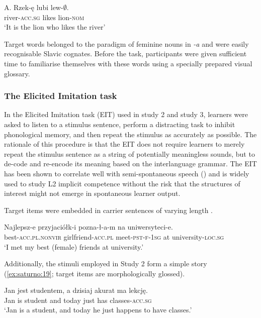 \documentclass[output=paper,            colorlinks, citecolor=brown            		  ]{langscibook}
\begin{document}
 \gll A.  Rzek-ę    lubi  lew-${\emptyset}$.\\
{} river-\textsc{acc.sg}  likes  lion-\textsc{nom}\\
\glt \hspace{2.5ex}‘It is the lion who likes the river’
\z

Target words belonged to the paradigm of feminine nouns in \textit{{}-a} and were easily recognisable Slavic cognates. Before the task, participants were given sufficient time to familiarise themselves with these words using a specially prepared visual glossary.

\subsubsection{The Elicited Imitation task}\label{sec:saturno:3.1.2}

In the Elicited Imitation task (EIT) used in study 2 and study 3, learners were asked to listen to a stimulus sentence, perform a distracting task to inhibit phonological memory, and then repeat the stimulus as accurately as possible. The rationale of this procedure is that the EIT does not require learners to merely repeat the stimulus sentence as a string of potentially meaningless sounds, but to de-code and re-encode its meaning based on the interlanguage grammar. The EIT has been shown to correlate well with semi-spontaneous speech (\citealt{IsbellSon2022, KostromitinaPlonsky2022, WuEtAl2022}) and is widely used to study L2 implicit competence without the risk that the structures of interest might not emerge in spontaneous learner output. 

Target items were embedded in carrier sentences of varying length .

\ea\label{ex:saturno:18}  
\gll Najlepsz-e     przyjaciółk-i     pozna-ł-a-m     na   uniwersyteci-e.\\
  best-\textsc{acc.pl.nonvir}  girlfriend-\textsc{acc.pl}  meet-\textsc{pst-f-1sg}  at  university-\textsc{loc.sg}\\
\glt  ‘I met my best (female) friends at university.’
\z

Additionally, the stimuli employed in Study 2 form a simple story (\ref{ex:saturno:19}; target items are morphologically glossed).

\ea\label{ex:saturno:19}  
    \ea\label{ex:saturno:19a}
    \gll Jan  jest  studentem,   a  dzisiaj  akurat  ma   lekcję.\\
    Jan  is  student  and  today  just  has  classes-\textsc{acc.sg}\\
    \glt ‘Jan is a student, and today he just happens to have classes.’
\end{document}
